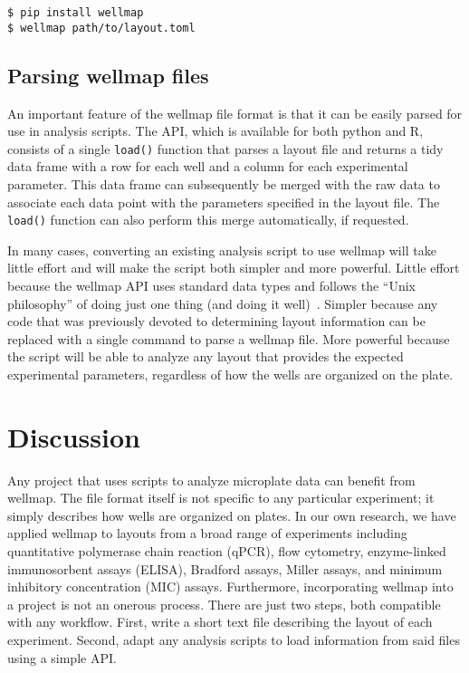 \documentclass{bmcart}
\begin{document}
\begin{lstlisting}
$ pip install wellmap
$ wellmap path/to/layout.toml
\end{lstlisting}


\subsection*{Parsing wellmap files}

An important feature of the wellmap file format is that it can be
easily parsed for use in analysis scripts. The API, which is available
for both python and R, consists of a single \texttt{load()} function
that parses a layout file and returns a tidy~\cite{wickham2014}
data frame with a row for each well and a column for each experimental
parameter. This data frame can subsequently be merged with the raw
data to associate each data point with the parameters specified in
the layout file. The \texttt{load()} function can also perform this
merge automatically, if requested.

In many cases, converting an existing analysis script to use wellmap
will take little effort and will make the script both simpler and
more powerful. Little effort because the wellmap API uses standard
data types and follows the ``Unix philosophy'' of doing just one
thing (and doing it well)~\cite{raymond2004}. Simpler because any
code that was previously devoted to determining layout information
can be replaced with a single command to parse a wellmap file. More
powerful because the script will be able to analyze any layout that
provides the expected experimental parameters, regardless of how the
wells are organized on the plate.

\section*{Discussion}

Any project that uses scripts to analyze microplate data can benefit
from wellmap. The file format itself is not specific to any particular
experiment; it simply describes how wells are organized on plates.
In our own research, we have applied wellmap to layouts from a broad
range of experiments including quantitative polymerase chain reaction
(qPCR), flow cytometry, enzyme-linked immunosorbent assays (ELISA),
Bradford assays, Miller assays, and minimum inhibitory concentration
(MIC) assays. Furthermore, incorporating wellmap into a project is
not an onerous process. There are just two steps, both compatible
with any workflow. First, write a short text file describing the layout
of each experiment. Second, adapt any analysis scripts to load information
from said files using a simple API.
\end{document}
